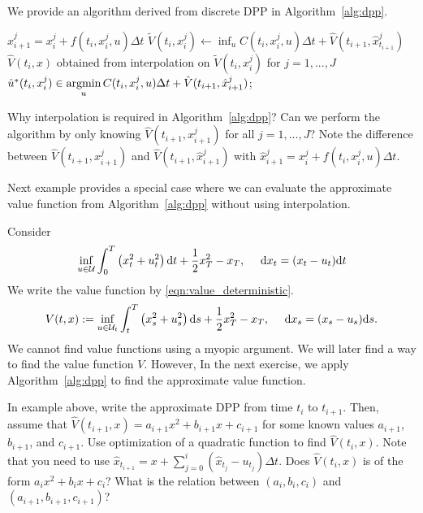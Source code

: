 \documentclass[11pt]{book}
\newcommand{\dt}{\text{\normalfont d}t}
\newcommand{\ds}{\text{\normalfont d}s}
\newcommand{\dx}{\text{\normalfont d}x}
\begin{document}
We provide an algorithm derived from discrete DPP in Algorithm~\ref{alg:dpp}.
\begin{algorithm}
        {$\hat{x}^j_{i+1}=x_i^j+f(t_{i},x_i^j,u)\Delta t$\;
        $\tilde{V}(t_{i},x^j_i)\leftarrow \inf_{u}C(t_{i},{x}^j_{i},u){{\Delta t}}+\hat{V}(t_{i+1},\hat{x}^j_{t_{i+1}})$\;
        $\hat{V}(t_{i},x)$ obtained from interpolation on $\tilde{V}(t_{i},x^j_i)$ for $j=1,...,J$\;
        $\hat{u}^*(t_i,x_i^j)\in\mathop{\text{\normalfont argmin}}\limits_{u}C(t_{i},{x}^j_{i},u){{\Delta t}}+\hat{V}(t_{i+1},\hat{x}^j_{i+1})$;
        }
        \caption{Numerical DPP}
         \label{alg:dpp}
\end{algorithm}
\begin{ex}
    Why interpolation is required in Algorithm~\ref{alg:dpp}? Can we perform the algorithm by only knowing  $\hat{V}(t_{i+1},{x}^j_{i+1})$ for all $j=1,...,J$? 
    Note the difference between $\hat{V}(t_{i+1},{x}^j_{i+1})$ and $\hat{V}(t_{i+1},\hat{x}^j_{i+1})$ with $\hat{x}^j_{i+1} = {x}^j_{i} + f(t_{i},x_i^j,u)\Delta t$.
\end{ex}
Next example provides a special case where we can evaluate the approximate value function from Algorithm~\ref{alg:dpp} without using interpolation.
\begin{eg}
    Consider 
    \begin{equation}
    \inf_{u\in\mathcal{U}} \int_0^T\left(x_t^2+u_t^2\right){\dt}+\frac12x_T^2-x_T,~~~~{\dx}_t=(x_t-u_t){\dt}
\end{equation}
We write the value function by \eqref{eqn:value_deterministic}. 
\begin{equation}
    V(t,x):= \inf_{u\in\mathcal{U}_{t}}\int_t^T\left(x_s^2+u_s^2\right){{\ds}}+\frac12x_T^2-x_T,~~~~{\dx}_s=(x_s-u_s){{\ds}}.
\end{equation}
We cannot find value functions using a myopic argument. We will later find a way to find the value function $V$. However, In the next exercise, we apply Algorithm~\ref{alg:dpp} to find the approximate value function.  
\end{eg}
\begin{ex}\label{ex:discrete_lqc}
    In example above, write the approximate DPP from time $t_{i}$ to $t_{i+1}$. Then, assume that $\hat{V}(t_{i+1},x)=a_{i+1}x^2+b_{i+1}x+c_{i+1}$ for some known values $a_{i+1}$, $b_{i+1}$, and $c_{i+1}$. Use  optimization of a quadratic function to find $\hat{V}(t_{i},x)$. Note that you need to use $\hat{x}_{t_{i+1}}=x+\sum_{j=0}^{i}(\hat{x}_{t_{j}}-u_{t_{j}})\Delta t$. Does $\hat{V}(t_{i},x)$ is of the form $a_{i}x^2+b_{i}x+c_{i}$? What is the relation between $(a_{i},b_{i},c_{i})$ and $(a_{i+1},b_{i+1},c_{i+1})$?
\end{ex}
\end{document}
